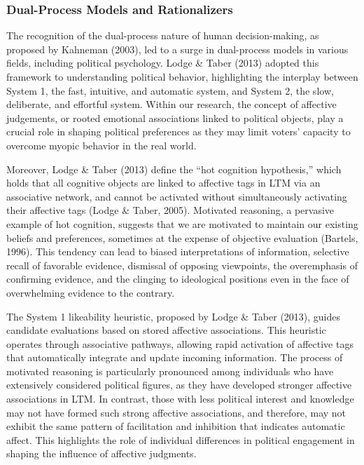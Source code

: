 \documentclass[
]{article}
\begin{document}
\hypertarget{dual-process-models-and-rationalizers}{%
\subsubsection{Dual-Process Models and
Rationalizers}\label{dual-process-models-and-rationalizers}}

The recognition of the dual-process nature of human decision-making, as
proposed by Kahneman (2003), led to a surge in dual-process models in
various fields, including political psychology. Lodge \& Taber (2013)
adopted this framework to understanding political behavior, highlighting
the interplay between System 1, the fast, intuitive, and automatic
system, and System 2, the slow, deliberate, and effortful system. Within
our research, the concept of affective judgements, or rooted emotional
associations linked to political objects, play a crucial role in shaping
political preferences as they may limit voters' capacity to overcome
myopic behavior in the real world.

Moreover, Lodge \& Taber (2013) define the ``hot cognition hypothesis,''
which holds that all cognitive objects are linked to affective tags in
LTM via an associative network, and cannot be activated without
simultaneously activating their affective tags (Lodge \& Taber, 2005).
Motivated reasoning, a pervasive example of hot cognition, suggests that
we are motivated to maintain our existing beliefs and preferences,
sometimes at the expense of objective evaluation (Bartels, 1996). This
tendency can lead to biased interpretations of information, selective
recall of favorable evidence, dismissal of opposing viewpoints, the
overemphasis of confirming evidence, and the clinging to ideological
positions even in the face of overwhelming evidence to the contrary.

The System 1 likeability heuristic, proposed by Lodge \& Taber (2013),
guides candidate evaluations based on stored affective associations.
This heuristic operates through associative pathways, allowing rapid
activation of affective tags that automatically integrate and update
incoming information. The process of motivated reasoning is particularly
pronounced among individuals who have extensively considered political
figures, as they have developed stronger affective associations in LTM.
In contrast, those with less political interest and knowledge may not
have formed such strong affective associations, and therefore, may not
exhibit the same pattern of facilitation and inhibition that indicates
automatic affect. This highlights the role of individual differences in
political engagement in shaping the influence of affective judgments.
\end{document}
